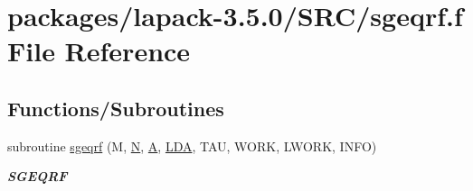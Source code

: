 \hypertarget{sgeqrf_8f}{}\section{packages/lapack-\/3.5.0/\+S\+R\+C/sgeqrf.f File Reference}
\label{sgeqrf_8f}
\subsection*{Functions/\+Subroutines}
\begin{DoxyCompactItemize}
\item 
subroutine \hyperlink{group__realGEcomputational_ga7cb54fa1727bf0166523036f4948bc56}{sgeqrf} (M, \hyperlink{polmisc_8c_a0240ac851181b84ac374872dc5434ee4}{N}, \hyperlink{classA}{A}, \hyperlink{example__user_8c_ae946da542ce0db94dced19b2ecefd1aa}{L\+D\+A}, T\+A\+U, W\+O\+R\+K, L\+W\+O\+R\+K, I\+N\+F\+O)
\begin{DoxyCompactList}\small\item\em {\bfseries S\+G\+E\+Q\+R\+F} \end{DoxyCompactList}\end{DoxyCompactItemize}
